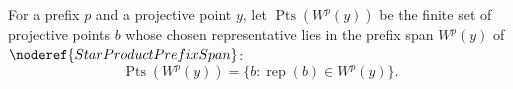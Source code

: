 \begin{definition}
For a prefix \(p\) and a projective point \(y\), let
\(\operatorname{Pts}(W^p(y))\) be the finite set of projective points \(b\)
whose chosen representative lies in the prefix span
\(W^p(y)\) of \(\noderef{StarProductPrefixSpan}\):
\[
  \operatorname{Pts}(W^p(y))
  =\{b:\operatorname{rep}(b)\in W^p(y)\}.
\]
\end{definition}
